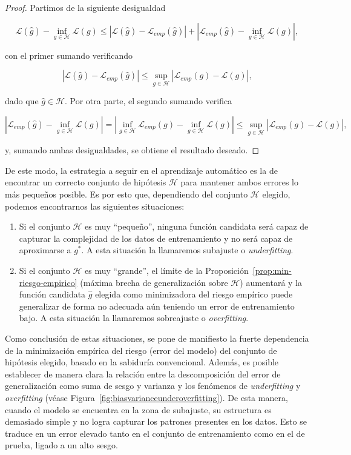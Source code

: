 \begin{proof}
    Partimos de la siguiente desigualdad

    \[ \mathcal{L}(\hat{g}) - \inf_{g \in \mathcal{H}}\mathcal{L}(g) \leq  |\mathcal{L}(\hat{g}) - \mathcal{L}_{emp}(\hat{g})| + |\mathcal{L}_{emp}(\hat{g}) - \inf_{g \in \mathcal{H}}\mathcal{L}(g)|, \]

    con el primer sumando verificando

    \[ |\mathcal{L}(\hat{g}) - \mathcal{L}_{emp}(\hat{g})| \leq \sup_{g \in \mathcal{H}}|\mathcal{L}_{emp}(g) - \mathcal{L}(g)|, \]

    dado que $\hat{g} \in \mathcal{H}$. Por otra parte, el segundo sumando verifica

    \[ |\mathcal{L}_{emp}(\hat{g}) - \inf_{g \in \mathcal{H}}\mathcal{L}(g)| = |\inf_{g \in \mathcal{H}} \mathcal{L}_{emp}(g) - \inf_{g \in \mathcal{H}}\mathcal{L}(g)| \leq \sup_{g \in \mathcal{H}}|\mathcal{L}_{emp}(g) - \mathcal{L}(g)|, \]

    y, sumando ambas desigualdades, se obtiene el resultado deseado.
\end{proof}

De este modo, la estrategia a seguir en el aprendizaje automático es la de encontrar un correcto conjunto de hipótesis $\mathcal{H}$ para mantener ambos errores lo más pequeños posible. Es por esto que, dependiendo del conjunto $\mathcal{H}$ elegido, podemos encontrarnos las siguientes situaciones:

\begin{enumerate}
    \item Si el conjunto $\mathcal{H}$ es muy ``pequeño'', ninguna función candidata será capaz de capturar la complejidad de los datos de entrenamiento y no será capaz de aproximarse a $g^{*}$. A esta situación la llamaremos subajuste o \emph{underfitting}.
    \item Si el conjunto $\mathcal{H}$ es muy ``grande'', el límite de la Proposición~\ref{prop:min-riesgo-empirico} (máxima brecha de generalización sobre $\mathcal{H}$) aumentará y la función candidata $\hat{g}$ elegida como minimizadora del riesgo empírico puede generalizar de forma no adecuada aún teniendo un error de entrenamiento bajo. A esta situación la llamaremos sobreajuste o \emph{overfitting}.
\end{enumerate}

Como conclusión de estas situaciones, se pone de manifiesto la fuerte dependencia de la minimización empírica del riesgo (error del modelo) del conjunto de hipótesis elegido, basado en la sabiduría convencional. Además, es posible establecer de manera clara la relación entre la descomposición del error de generalización como suma de sesgo y varianza y los fenómenos de \emph{underfitting} y \emph{overfitting} (véase Figura~\ref{fig:biasvarianceunderoverfitting}). De esta manera, cuando el modelo se encuentra en la zona de subajuste, su estructura es demasiado simple y no logra capturar los patrones presentes en los datos. Esto se traduce en un error elevado tanto en el conjunto de entrenamiento como en el de prueba, ligado a un alto sesgo.

